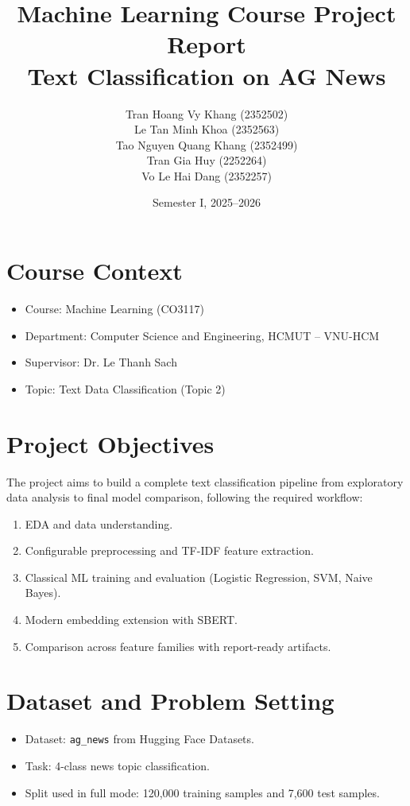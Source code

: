 \documentclass[a4paper,12pt]{article}
\title{Machine Learning Course Project Report\\Text Classification on AG News}
\author{
Tran Hoang Vy Khang (2352502)\\
Le Tan Minh Khoa (2352563)\\
Tao Nguyen Quang Khang (2352499)\\
Tran Gia Huy (2252264)\\
Vo Le Hai Dang (2352257)
}
\date{Semester I, 2025--2026}
\begin{document}
\maketitle

\section{Course Context}
\begin{itemize}[leftmargin=*]
    \item Course: Machine Learning (CO3117)
    \item Department: Computer Science and Engineering, HCMUT -- VNU-HCM
    \item Supervisor: Dr. Le Thanh Sach
    \item Topic: Text Data Classification (Topic 2)
\end{itemize}

\section{Project Objectives}
The project aims to build a complete text classification pipeline from exploratory data analysis to final model comparison, following the required workflow:
\begin{enumerate}[leftmargin=*]
    \item EDA and data understanding.
    \item Configurable preprocessing and TF-IDF feature extraction.
    \item Classical ML training and evaluation (Logistic Regression, SVM, Naive Bayes).
    \item Modern embedding extension with SBERT.
    \item Comparison across feature families with report-ready artifacts.
\end{enumerate}

\section{Dataset and Problem Setting}
\begin{itemize}[leftmargin=*]
    \item Dataset: \texttt{ag\_news} from Hugging Face Datasets.
    \item Task: 4-class news topic classification.
    \item Split used in full mode: 120,000 training samples and 7,600 test samples.
\end{itemize}
\end{document}
